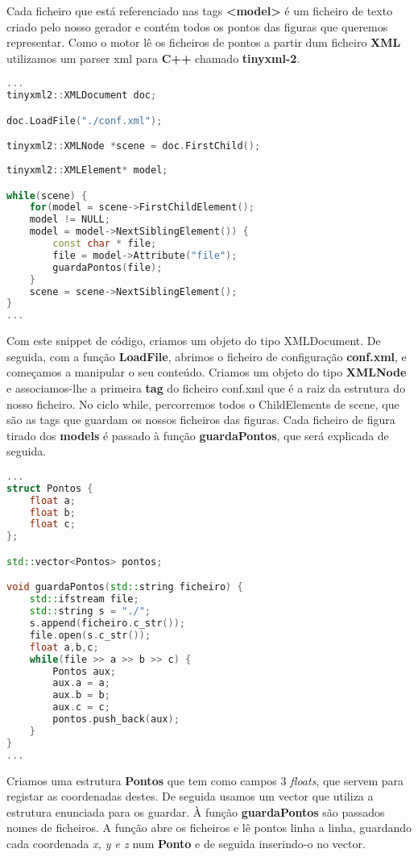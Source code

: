 \documentclass{article}
\begin{document}
Cada ficheiro que está referenciado nas tags \textbf{<model>} é um ficheiro de texto criado pelo nosso gerador e contém todos os pontos das figuras que queremos representar.
Como o motor lê os ficheiros de pontos a partir dum ficheiro \textbf{XML} utilizamos um parser xml para \textbf{C++} chamado \textbf{tinyxml-2}.

\begin{file}
	\begin{lstlisting}[language=C++]
...
tinyxml2::XMLDocument doc;

doc.LoadFile("./conf.xml");

tinyxml2::XMLNode *scene = doc.FirstChild();
		
tinyxml2::XMLElement* model;

while(scene) {
	for(model = scene->FirstChildElement();
	model != NULL; 
	model = model->NextSiblingElement()) {
		const char * file;
		file = model->Attribute("file");
		guardaPontos(file);
	}
	scene = scene->NextSiblingElement();
}
...

	\end{lstlisting}
\end{file}

Com este snippet de código, criamos um objeto do tipo XMLDocument. De seguida, com a função \textbf{LoadFile}, abrimos o ficheiro de configuração \textbf{conf.xml}, e começamos a manipular o seu conteúdo.
Criamos um objeto do tipo \textbf{XMLNode} e associamos-lhe a primeira \textbf{tag} do ficheiro conf.xml que é a raiz da estrutura do nosso ficheiro.
No ciclo while, percorremos todos o ChildElements de scene, que são as tags que guardam os nossos ficheiros das figuras.
Cada ficheiro de figura tirado dos \textbf{models} é passado à função \textbf{guardaPontos}, que será explicada de seguida.

\begin{file}
	\begin{lstlisting}[language=C++]
...
struct Pontos {
    float a;
    float b;
    float c;
};

std::vector<Pontos> pontos;

void guardaPontos(std::string ficheiro) {
	std::ifstream file;
	std::string s = "./";
	s.append(ficheiro.c_str());
	file.open(s.c_str());
	float a,b,c;
	while(file >> a >> b >> c) {
		Pontos aux;
		aux.a = a;
		aux.b = b;
		aux.c = c;
		pontos.push_back(aux);
	}
}
...
	\end{lstlisting}
\end{file}

Criamos uma estrutura \textbf{Pontos} que tem como campos 3 \textit{floats}, que servem para registar as coordenadas destes. De seguida usamos um vector que utiliza a estrutura enunciada para os guardar.
À função \textbf{guardaPontos} são passados nomes de ficheiros. A função abre os ficheiros e lê pontos linha a linha, guardando cada coordenada \textit{x, y e z} num \textbf{Ponto} e de seguida inserindo-o no vector.
\end{document}
